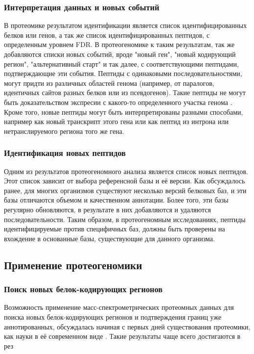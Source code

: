 \subsubsection{Интерпретация данных и новых событий}
В протеомике результатом идентификации является список идентифицированных белков или генов, а так же список идентифицированных пептидов, с определенным уровнем FDR. В протеогеномике к таким результатам, так же добавляются списки новых событий, вроде "новый ген", "новый кодирующий регион", "альтернативный старт" и так далее, с соответствующими пептидами, подтверждающие эти события. Пептиды с одинаковыми последовательностями, могут придти из различных областей генома (например, от паралогов, идентичных сайтов разных белков или из псевдогенов). Такие пептиды не могут быть доказательством экспресии с какого-то определенного участка генома \cite{nesvizhskii2005interpretation}. Кроме того, новые пептиды могут быть интерпретированы разными способами, например как новый транскрипт этого гена или как пептид из интрона или нетранслируемого региона того же гена. 

\subsubsection{Идентификация новых пептидов}
Одним из результатов протеогеномного анализа является список новых пептидов. Этот список зависит от выбора референсной базы и её версии. Как обсуждалось ранее, для многих организмов существуют несколько версий белковых баз, и эти базы отличаются объемом и качественном аннотации. Более того, эти базы регулярно обновляются, в результате в них добавляются и удаляются последовательности. Таким образом, в протеогеномным исследованиях, пептиды идентифицируемые против специфичных баз, должны быть проверены на вхождение в основанные базы, существующие для данного организма.

\subsection{Применение протеогеномики}

\subsubsection{Поиск новых белок-кодирующих регионов}
Возможность применение масс-спектрометрических протеомных данных для поиска новых белок-кодирующих регионов и подтверждения границ уже аннотированных, обсуждалась начиная с первых дней существования протеомики, как науки в её современном виде \cite{choudhary2001interrogating, andersen2001mass}. Такие результаты чаще всего достигаются в рез


